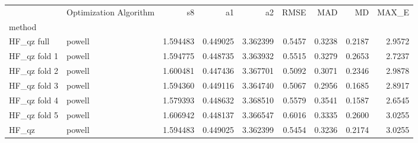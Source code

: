 \begin{tabular}{llrrrrrrr}
 & Optimization Algorithm & s8 & a1 & a2 & RMSE & MAD & MD & MAX_E \\
method &  &  &  &  &  &  &  &  \\
HF_qz full & powell & 1.594483 & 0.449025 & 3.362399 & 0.5457 & 0.3238 & 0.2187 & 2.9572 \\
HF_qz fold 1 & powell & 1.594775 & 0.448735 & 3.363932 & 0.5515 & 0.3279 & 0.2653 & 2.7237 \\
HF_qz fold 2 & powell & 1.600481 & 0.447436 & 3.367701 & 0.5092 & 0.3071 & 0.2346 & 2.9878 \\
HF_qz fold 3 & powell & 1.594360 & 0.449116 & 3.364740 & 0.5067 & 0.2956 & 0.1685 & 2.8917 \\
HF_qz fold 4 & powell & 1.579393 & 0.448632 & 3.368510 & 0.5579 & 0.3541 & 0.1587 & 2.6545 \\
HF_qz fold 5 & powell & 1.606942 & 0.448137 & 3.366547 & 0.6016 & 0.3335 & 0.2600 & 3.0255 \\
HF_qz & powell & 1.594483 & 0.449025 & 3.362399 & 0.5454 & 0.3236 & 0.2174 & 3.0255 \\
\end{tabular}
